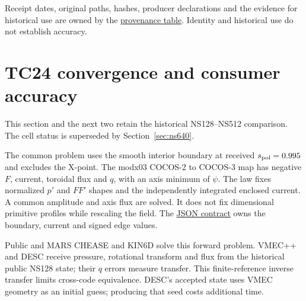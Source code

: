 \documentclass[10pt,a4paper]{article}
\newcommand{\tcroot}{https://gitlab.tugraz.at/plasma/proj/ntv/iter_tc24/-/blob/5f267d12c/}
\newcommand{\tcfile}[2]{\href{\tcroot#1}{#2}}
\newcommand{\pageheading}[1]{\clearpage\section{#1}}
\begin{document}
Receipt dates, original paths, hashes, producer declarations and the evidence
for historical use are owned by the
\tcfile{equilibrium/phase4/tc24/EQUILIBRIUM_PROVENANCE.md}{provenance table}.
Identity and historical use do not establish accuracy.

\pageheading{TC24 convergence and consumer accuracy}
This section and the next two retain the historical NS128--NS512 comparison.
The cell status is superseded by Section~\ref{sec:ns640}.

The common problem uses the smooth interior boundary at received
$s_{\rm pol}=0.995$ and excludes the X-point. The modx03 COCOS-2 to COCOS-3 map
has negative $F$, current, toroidal flux and $q$, with an axis minimum of $\psi$.
The law fixes normalized $p'$ and $FF'$ shapes and the independently integrated
enclosed current. A common amplitude and axis flux are solved. It does not
fix dimensional primitive profiles while rescaling the field. The
\tcfile{equilibrium/phase4/tc24/reference/reference_case.json}{JSON contract}
owns the boundary, current and signed edge values.

Public and MARS CHEASE and KIN6D solve this forward problem. VMEC++ and DESC
receive pressure, rotational transform and flux from the historical public
NS128 state;
their $q$ errors measure transfer. This finite-reference inverse transfer
limits cross-code equivalence. DESC's accepted state uses VMEC geometry as an
initial guess; producing that seed costs additional time.

\begin{center}\small

\end{center}
\end{document}
